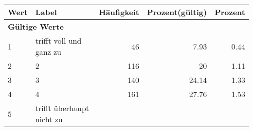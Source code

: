      \begin{longtable}{lXrrr}
     \toprule
     \textbf{Wert} & \textbf{Label} & \textbf{Häufigkeit} & \textbf{Prozent(gültig)} & \textbf{Prozent} \\
     \endhead
     \midrule
     \multicolumn{5}{l}{\textbf{Gültige Werte}}\\

     1 &
     \multicolumn{1}{X}{ trifft voll und ganz zu   } &


       \num{46} &
       \num[round-mode=places,round-precision=2]{7,93} &
         \num[round-mode=places,round-precision=2]{0,44} \\

     2 &
     \multicolumn{1}{X}{ 2   } &


       \num{116} &
       \num[round-mode=places,round-precision=2]{20} &
         \num[round-mode=places,round-precision=2]{1,11} \\

     3 &
     \multicolumn{1}{X}{ 3   } &


       \num{140} &
       \num[round-mode=places,round-precision=2]{24,14} &
         \num[round-mode=places,round-precision=2]{1,33} \\

     4 &
     \multicolumn{1}{X}{ 4   } &


       \num{161} &
       \num[round-mode=places,round-precision=2]{27,76} &
         \num[round-mode=places,round-precision=2]{1,53} \\

     5 &
     \multicolumn{1}{X}{ trifft überhaupt nicht zu   } &



\end{longtable}
